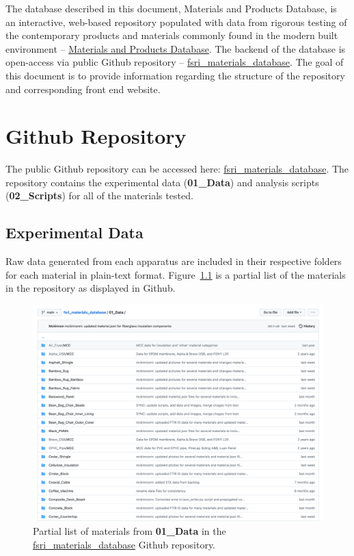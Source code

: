 \documentclass[12pt,oneside]{book}
\begin{document}
The database described in this document, Materials and Products Database, is an interactive, web-based repository populated with data from rigorous testing of the contemporary products and materials commonly found in the modern built environment -- \href{https://materials.fsri.org}{Materials and Products Database}. The backend of the database is open-access via public Github repository -- \href{https://github.com/ulfsri/fsri_materials_database}{fsri\_materials\_database}. The goal of this document is to provide information regarding the structure of the repository and corresponding front end website.

\chapter{Github Repository}
\label{sec:repo}

The public Github repository can be accessed here: \href{https://github.com/ulfsri/fsri_materials_database}{fsri\_materials\_database}. The repository contains the experimental data ({\bf 01\_Data}) and analysis scripts ({\bf 02\_Scripts}) for all of the materials tested. 

\section{Experimental Data}

Raw data generated from each apparatus are included in their respective folders for each material in plain-text format. Figure~\ref{fig:mat_list} is a partial list of the materials in the repository as displayed in Github.

\begin{figure}[!ht]
\centering
\includegraphics[width=.95\columnwidth]{Figures/partial_materials_github}
\caption[Partial List of Materials from Github Repository]{Partial list of materials from {\bf 01\_Data} in the \href{https://github.com/ulfsri/fsri_materials_database}{fsri\_materials\_database} Github repository.}
\label{fig:mat_list}
\end{figure}
\end{document}
